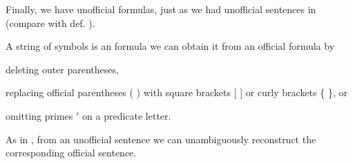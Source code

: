 Finally, we have unofficial formulas, just as we had unofficial sentences in \GSL{} (compare with def. ).
\begin{majorILnc}{}
A string of symbols is an  formula \Iff we can obtain it from an official formula by
\begin{cenumerate}
\item deleting outer parentheses,
\item replacing official parentheses ( ) with square brackets [ ] or curly brackets \{ \}, or
\item omitting primes $'$ on a predicate letter.
\end{cenumerate}
\end{majorILnc}
\noindent{}As in \GSL{}, from an unofficial sentence we can unambiguously reconstruct the corresponding official
sentence.
